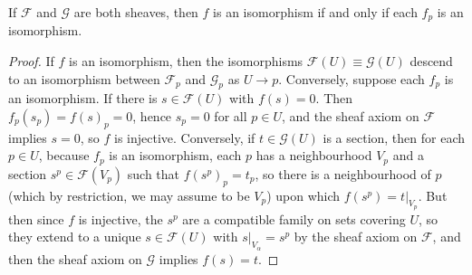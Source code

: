\begin{theorem}
    If $\mathcal{F}$ and $\mathcal{G}$ are both sheaves, then $f$ is an isomorphism if and only if each $f_p$ is an isomorphism.
\end{theorem}
\begin{proof}
    If $f$ is an isomorphism, then the isomorphisms $\mathcal{F}(U) \equiv \mathcal{G}(U)$ descend to an isomorphism between $\mathcal{F}_p$ and $\mathcal{G}_p$ as $U \to p$. Conversely, suppose each $f_p$ is an isomorphism. If there is $s \in \mathcal{F}(U)$ with $f(s) = 0$. Then $f_p(s_p) = f(s)_p = 0$, hence $s_p = 0$ for all $p \in U$, and the sheaf axiom on $\mathcal{F}$ implies $s = 0$, so $f$ is injective. Conversely, if $t \in \mathcal{G}(U)$ is a section, then for each $p \in U$, because $f_p$ is an isomorphism, each $p$ has a neighbourhood $V_p$ and a section $s^p \in \mathcal{F}(V_p)$ such that $f(s^p)_p = t_p$, so there is a neighbourhood of $p$ (which by restriction, we may assume to be $V_p$) upon which $f(s^p) = t|_{V_p}$. But then since $f$ is injective, the $s^p$ are a compatible family on sets covering $U$, so they extend to a unique $s \in \mathcal{F}(U)$ with $s|_{V_\alpha} = s^p$ by the sheaf axiom on $\mathcal{F}$, and then the sheaf axiom on $\mathcal{G}$ implies $f(s) = t$.
\end{proof}

